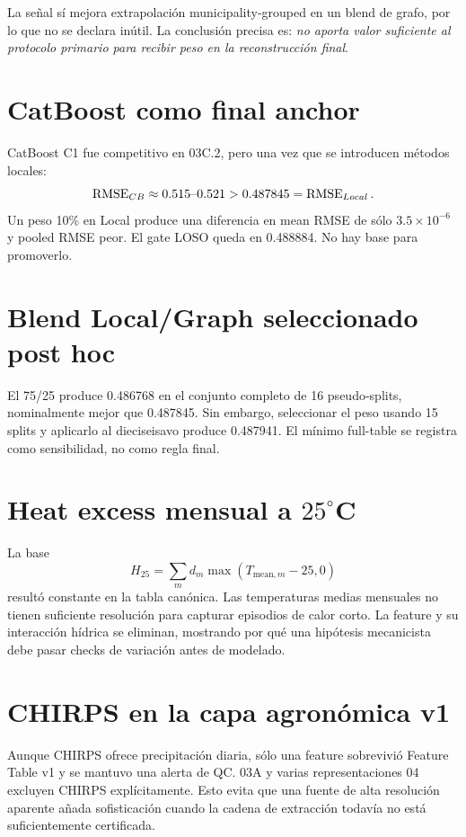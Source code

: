 La señal sí mejora extrapolación municipality-grouped en un blend de grafo, por lo que no se
declara inútil. La conclusión precisa es: \emph{no aporta valor suficiente al protocolo
primario para recibir peso en la reconstrucción final}.

\section{CatBoost como final anchor}

CatBoost C1 fue competitivo en 03C.2, pero una vez que se introducen métodos locales:
\[
\operatorname{RMSE}_{CB}\approx0.515\text{--}0.521
>
0.487845=\operatorname{RMSE}_{Local}.
\]
Un peso 10\% en Local produce una diferencia en mean RMSE de sólo
$3.5\times10^{-6}$ y pooled RMSE peor. El gate LOSO queda en 0.488884. No hay base para
promoverlo.

\section{Blend Local/Graph seleccionado post hoc}

El 75/25 produce 0.486768 en el conjunto completo de 16 pseudo-splits, nominalmente mejor que
0.487845. Sin embargo, seleccionar el peso usando 15 splits y aplicarlo al dieciseisavo
produce 0.487941. El mínimo full-table se registra como sensibilidad, no como regla final.

\section{Heat excess mensual a \texorpdfstring{$25^\circ$C}{25 C}}

La base
\[
H_{25}
=
\sum_m d_m\max(T_{\mathrm{mean},m}-25,0)
\]
resultó constante en la tabla canónica. Las temperaturas medias mensuales no tienen suficiente
resolución para capturar episodios de calor corto. La feature y su interacción hídrica se
eliminan, mostrando por qué una hipótesis mecanicista debe pasar checks de variación antes de
modelado.

\section{CHIRPS en la capa agronómica v1}

Aunque CHIRPS ofrece precipitación diaria, sólo una feature sobrevivió Feature Table v1 y se
mantuvo una alerta de QC. 03A y varias representaciones 04 excluyen CHIRPS explícitamente.
Esto evita que una fuente de alta resolución aparente añada sofisticación cuando la cadena de
extracción todavía no está suficientemente certificada.

